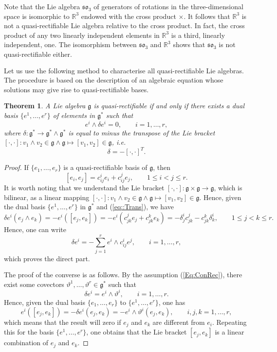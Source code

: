 \documentclass[12pt]{article}
\theoremstyle{plain}
\newtheorem{theorem}{Theorem}[section]
\theoremstyle{definition}
\numberwithin{equation}{section}
\begin{document}
 



Note that the Lie algebra  $\mathfrak{so}_3$ of generators of rotations in the three-dimensional space is isomorphic to $\mathbb{R}^3$ endowed with the cross product $\times$. It follows that $\mathbb{R}^3$ is not a quasi-rectifiable Lie algebra relative to the cross product. In fact, the cross product of any two linearly independent elements in $\mathbb{R}^3$ is a third, linearly independent, one. The isomorphism between $\mathfrak{so}_3$ and $\mathbb{R}^3$ shows that $\mathfrak{so}_3$ is not quasi-rectifiable either. 




Let us use the following method to characterise all quasi-rectifiable Lie algebras. The procedure is based on the description of an algebraic equation whose solutions may give rise to quasi-rectifiable bases. 

\begin{theorem}\label{Th::RectCri} A Lie algebra $\mathfrak{g}$ is quasi-rectifiable if and only if there exists a dual basis $\{e^1,\ldots,e^r\}$ of elements in $\mathfrak{g}^*$ such that 
\begin{equation}\label{Eq:ConRec}
e^i\wedge \delta e^i=0,\qquad i=1,\ldots,r,
\end{equation}
where $
\delta:\mathfrak{g}^*\rightarrow \mathfrak{g}^*\wedge \mathfrak{g}^*$ is equal to minus the transpose of the Lie bracket $[\cdot,\cdot]:v_1\wedge v_2\in \mathfrak{g}\wedge  \mathfrak{g}\mapsto [v_1,v_2]\in \mathfrak{g}$, i.e. 
\begin{equation}\label{eq::Trans}
\delta=-[\cdot,\cdot]^T.
\end{equation}
\end{theorem}
\begin{proof} If $\{e_1,\ldots,e_r\}$ is a quasi-rectifiable basis of $\mathfrak{g}$, then
$$
[e_i,e_j]=c_{ij}^ie_i+c_{ij}^je_j,\qquad 1\leq i<j\leq r.
$$
It is worth noting that we understand the Lie bracket $[\cdot,\cdot]:\mathfrak{g}\times\mathfrak{g}\rightarrow \mathfrak{g}$, which is bilinear, as a linear mapping $[\cdot,\cdot]:v_1\wedge v_2\in \mathfrak{g}\wedge\mathfrak{g}\mapsto [v_1,v_2]\in \mathfrak{g}$. Hence, given the dual basis $\{e^1,\ldots,e^r\}$ in $\mathfrak{g}^*$ and (\ref{eq::Trans}), we have 
$$
\delta e^i(e_j\wedge e_k)=-e^i([e_j,e_k])=-e^i(c_{jk}^je_j+c_{jk}^ke_k)=-\delta^i_jc_{jk}^j-c_{jk}^k\delta_k^i,\qquad 1\leq j<k\leq r.
$$
Hence, one can write
$$
\delta e^i=-\sum_{j=1}^re^i\wedge c_{ij}^ie^j,\qquad i=1,\ldots,r,
$$
which proves the direct part. 

The proof of the converse is as follows. By the assumption (\ref{Eq:ConRec}), there exist some covectors $\vartheta^1,\ldots,\vartheta^r\in \mathfrak{g}^*$ such that
$$
\delta e^i=e^i\wedge \vartheta^i,\qquad i=1,\ldots,r.
$$
  Hence, given the dual basis $\{e_1,\ldots,e_r\}$ to $\{e^1,\ldots,e^r\}$, one has
  $$
  e^i([e_j,e_k])=-\delta e^i(e_j,e_k)=-e^i\wedge \vartheta^i(e_j,e_k),\qquad i,j,k=1,\ldots,r,
  $$
  which means that the result will zero if $e_j$ and $e_k$ are different from $e_i$. Repeating this for the basis $\{e^1,\ldots,e^r\}$, one obtains that the Lie bracket $[e_j,e_k]$ is a linear combination of  $e_j$ and $e_k$. 
\end{proof}
\end{document}
